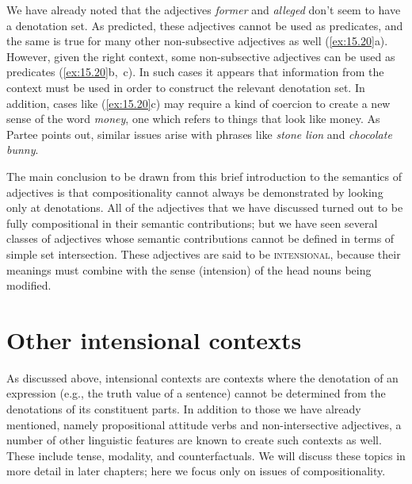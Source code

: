 We have already noted that the adjectives \textit{former} and \textit{alleged} don’t seem to have a denotation set. As predicted, these adjectives cannot be used as predicates, and the same is true for many other non-subsective adjectives as well (\ref{ex:15.20}a). However, given the right context, some non-subsective adjectives can be used as predicates (\ref{ex:15.20}b,~c). In such cases it appears that information from the context must be used in order to construct the relevant denotation set. In addition, cases like (\ref{ex:15.20}c) may require a kind of coercion to create a new sense of the word \textit{money}, one which refers to things that look like money. As Partee points out, similar issues arise with phrases like \textit{stone lion} and \textit{chocolate bunny}.


\ea \label{ex:15.20}
                       \z
\z


The main conclusion to be drawn from this brief introduction to the semantics of adjectives is that compositionality cannot always be demonstrated by looking only at denotations. All of the adjectives that we have discussed turned out to be fully compositional in their semantic contributions; but we have seen several classes of adjectives whose semantic contributions cannot be defined in terms of simple set intersection. These adjectives are said to be \textsc{intensional}, because their meanings must combine with the sense (intension) of the head nouns being modified.


\section{Other intensional contexts}\label{sec:15.4}

As discussed above, intensional contexts are contexts where the denotation of an expression (e.g., the truth value of a sentence) cannot be determined from the denotations of its constituent parts. In addition to those we have already mentioned, namely propositional attitude verbs and non-intersective adjectives, a number of other linguistic features are known to create such contexts as well. These include tense, modality, and counterfactuals. We will discuss these topics in more detail in later chapters; here we focus only on issues of compositionality.



